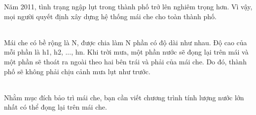 Năm 2011, tình trạng ngập lụt trong thành phố trở lên nghiêm trọng hơn. Vì vậy, mọi người quyết định xây dựng hệ thống mái che cho toàn thành phố.  


\\   Mái che có bề rộng là N, được chia làm N phần có độ dài như nhau. Độ cao của mỗi phần là h1, h2, ..., hn. Khi trời mưa, một phần nước sẽ đọng lại trên mái và một phần sẽ thoát ra ngoài theo hai bên trái và phải của mái che. Do đó, thành phố sẽ không phải chịu cảnh mưa lụt như trước.  


\\   Nhằm mục đích bảo trì mái che, bạn cần viết chương trình tính lượng nước lớn nhất có thể đọng lại trên mái che.